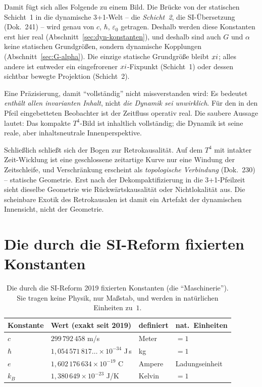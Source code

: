 Damit fügt sich alles Folgende zu einem Bild. Die Brücke von der statischen
Schicht~1 in die dynamische 3+1-Welt -- die \emph{Schicht~2}, die SI-Übersetzung
(Dok.~241) -- wird genau von $c$, $\hbar$, $\varepsilon_0$ getragen. Deshalb werden
diese Konstanten erst hier real (Abschnitt~\ref{sec:dyn-konstanten}), und deshalb
sind auch $G$ und $\alpha$ keine statischen Grundgrößen, sondern dynamische
Kopplungen (Abschnitt~\ref{sec:G-alpha}). Die einzige statische Grundgröße bleibt
$xi$; alles andere ist entweder ein eingefrorener $xi$-Fixpunkt
(Schicht~1) oder dessen sichtbar bewegte Projektion (Schicht~2).

Eine Präzisierung, damit ``vollständig'' nicht missverstanden wird: Es bedeutet
\emph{enthält allen invarianten Inhalt}, nicht \emph{die Dynamik sei unwirklich}.
Für den in den Pfeil eingebetteten Beobachter ist der Zeitfluss operativ real. Die
saubere Aussage lautet: Das kompakte $T^4$-Bild ist inhaltlich vollständig; die
Dynamik ist seine reale, aber inhaltsneutrale Innenperspektive.

Schließlich schließt sich der Bogen zur Retrokausalität. Auf dem $T^4$ mit intakter
Zeit-Wicklung ist eine geschlossene zeitartige Kurve nur eine Windung der
Zeitschleife, und Verschränkung erscheint als \emph{topologische Verbindung}
(Dok.~230) -- statische Geometrie. Erst nach der Dekompaktifizierung in die
3+1-Pfeilzeit sieht dieselbe Geometrie wie Rückwärtskausalität oder Nichtlokalität
aus. Die scheinbare Exotik des Retrokausalen ist damit ein Artefakt der
dynamischen Innensicht, nicht der Geometrie.

\section{Die durch die SI-Reform fixierten Konstanten}

\begin{table}[htbp]
  \centering
  \caption{Die durch die SI-Reform 2019 fixierten Konstanten (die ``Maschinerie'').
           Sie tragen keine Physik, nur Maßstab, und werden in natürlichen
           Einheiten zu~$1$.}
  \label{tab:si-fixiert}
  \begin{tabular}{llll}
    \toprule
    Konstante & Wert (exakt seit 2019) & definiert & nat.\ Einheiten \\
    \midrule
    $c$     & $299\,792\,458$ m/s                          & Meter   & $=1$ \\
    $\hbar$ & $1{,}054\,571\,817\ldots\times10^{-34}$ J\,s & kg      & $=1$ \\
    $e$     & $1{,}602\,176\,634\times10^{-19}$ C           & Ampere  & Ladungseinheit \\
    $k_B$   & $1{,}380\,649\times10^{-23}$ J/K              & Kelvin  & $=1$ \\
    \bottomrule
  \end{tabular}
\end{table}

